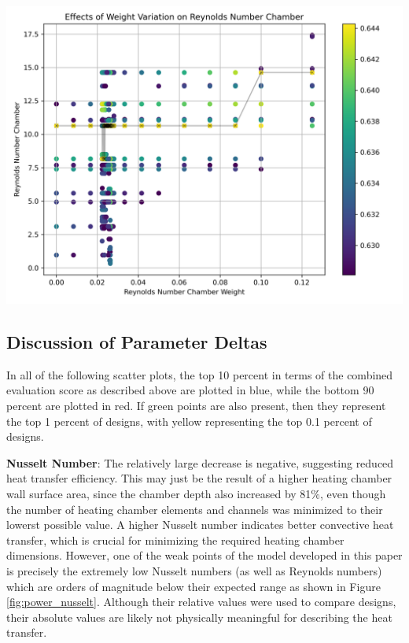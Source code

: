 \documentclass{homework}
\begin{document}
\begin{multicols}{2}
  \begin{minipage}{\linewidth}
      \centering
      \includegraphics[width=\linewidth]{images/reynolds_number_chamber_sensitivity.png}
      \label{fig:reynolds_sens}
  \end{minipage} 


\subsection{Discussion of Parameter Deltas}

In all of the following scatter plots, the top 10 percent in terms of the combined evaluation score as described above are plotted in blue, while the bottom 90 percent are plotted in red. If green points are also present, then they represent the top 1 percent of designs, with yellow representing the top 0.1 percent of designs.

\textbf{Nusselt Number}: The relatively large decrease is negative, suggesting reduced heat transfer efficiency. This may just be the result of a higher heating chamber wall surface area, since the chamber depth also increased by 81\%, even though the number of heating chamber elements and channels was minimized to their lowerst possible value. A higher Nusselt number indicates better convective heat transfer, which is crucial for minimizing the required heating chamber dimensions. However, one of the weak points of the model developed in this paper is precisely the extremely low Nusselt numbers (as well as Reynolds numbers) which are orders of magnitude below their expected range as shown in Figure \ref{fig:power_nusselt}. Although their relative values were used to compare designs, their absolute values are likely not physically meaningful for describing the heat transfer.


\end{multicols}
\end{document}
